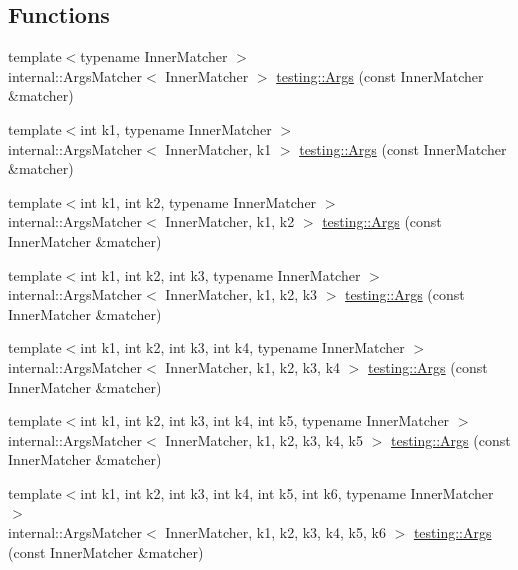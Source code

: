 \subsection*{Functions}
\begin{DoxyCompactItemize}
\item 
{\footnotesize template$<$typename Inner\+Matcher $>$ }\\internal\+::\+Args\+Matcher$<$ Inner\+Matcher $>$ \hyperlink{namespacetesting_aaca153f67b689b8b9d5b8c67ecf8cee4}{testing\+::\+Args} (const Inner\+Matcher \&matcher)
\item 
{\footnotesize template$<$int k1, typename Inner\+Matcher $>$ }\\internal\+::\+Args\+Matcher$<$ Inner\+Matcher, k1 $>$ \hyperlink{namespacetesting_af67bac6da407df7586f60cfa2c9b602d}{testing\+::\+Args} (const Inner\+Matcher \&matcher)
\item 
{\footnotesize template$<$int k1, int k2, typename Inner\+Matcher $>$ }\\internal\+::\+Args\+Matcher$<$ Inner\+Matcher, k1, k2 $>$ \hyperlink{namespacetesting_a663409e441584c81f496e9c98fd3453c}{testing\+::\+Args} (const Inner\+Matcher \&matcher)
\item 
{\footnotesize template$<$int k1, int k2, int k3, typename Inner\+Matcher $>$ }\\internal\+::\+Args\+Matcher$<$ Inner\+Matcher, k1, k2, k3 $>$ \hyperlink{namespacetesting_abd3ddae153e1c452b7625808cc4d820b}{testing\+::\+Args} (const Inner\+Matcher \&matcher)
\item 
{\footnotesize template$<$int k1, int k2, int k3, int k4, typename Inner\+Matcher $>$ }\\internal\+::\+Args\+Matcher$<$ Inner\+Matcher, k1, k2, k3, k4 $>$ \hyperlink{namespacetesting_aeff7e644fd00516c3519fe8c0dc1aee2}{testing\+::\+Args} (const Inner\+Matcher \&matcher)
\item 
{\footnotesize template$<$int k1, int k2, int k3, int k4, int k5, typename Inner\+Matcher $>$ }\\internal\+::\+Args\+Matcher$<$ Inner\+Matcher, k1, k2, k3, k4, k5 $>$ \hyperlink{namespacetesting_aede9fd33cce0d21f5e31ba10a0706827}{testing\+::\+Args} (const Inner\+Matcher \&matcher)
\item 
{\footnotesize template$<$int k1, int k2, int k3, int k4, int k5, int k6, typename Inner\+Matcher $>$ }\\internal\+::\+Args\+Matcher$<$ Inner\+Matcher, k1, k2, k3, k4, k5, k6 $>$ \hyperlink{namespacetesting_abc92e87b4a9cad372b082d81479f3d48}{testing\+::\+Args} (const Inner\+Matcher \&matcher)

\end{DoxyCompactItemize}
